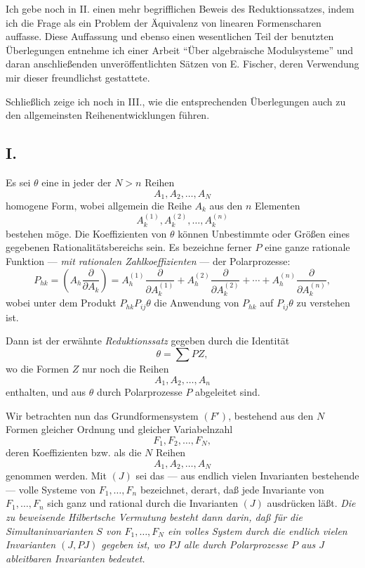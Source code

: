Ich gebe noch in II. einen mehr begrifflichen Beweis des Reduktionssatzes, indem ich die Frage als ein Problem der Äquivalenz von linearen Formenscharen auffasse. Diese Auffassung und ebenso einen wesentlichen Teil der benutzten Überlegungen entnehme ich einer Arbeit ``Über algebraische Modulsysteme'' und daran anschließenden unveröffentlichten Sätzen von E. Fischer, deren Verwendung mir dieser freundlichst gestattete.

Schließlich zeige ich noch in III., wie die entsprechenden Überlegungen auch zu den allgemeinsten Reihenentwicklungen führen.

\subsection*{I.}
Es sei $\theta$ eine in jeder der $N>n$ Reihen
\[
  A_1,A_2,\ldots,A_N
\]
homogene Form, wobei allgemein die Reihe $A_k$ aus den $n$ Elementen
\[
  A_k^{(1)},A_k^{(2)},\ldots,A_k^{(n)}
\]
bestehen möge. Die Koeffizienten von $\theta$ können Unbestimmte oder Größen eines gegebenen Rationalitätsbereichs sein. Es bezeichne ferner $P$ eine ganze rationale Funktion --- \emph{mit rationalen Zahlkoeffizienten} --- der Polarprozesse:
\[
  P_{hk}=\left(A_h\frac{\partial}{\partial A_k}\right)
  =A_h^{(1)}\frac{\partial}{\partial A_k^{(1)}}+
   A_h^{(2)}\frac{\partial}{\partial A_k^{(2)}}+
   \cdots+
   A_h^{(n)}\frac{\partial}{\partial A_k^{(n)}},
\]
wobei unter dem Produkt $P_{hk}P_{ij}\theta$ die Anwendung von $P_{hk}$ auf $P_{ij}\theta$ zu verstehen ist.

Dann ist der erwähnte \emph{Reduktionssatz} gegeben durch die Identität
\begin{equation}
  \theta=\sum PZ,
\tag{1}
\end{equation}
wo die Formen $Z$ nur noch die Reihen
\[
  A_1,A_2,\ldots,A_n
\]
enthalten, und aus $\theta$ durch Polarprozesse $P$ abgeleitet sind.

Wir betrachten nun das Grundformensystem $(F')$, bestehend aus den $N$ Formen gleicher Ordnung und gleicher Variabelnzahl
\[
  F_1,F_2,\ldots,F_N,
\]
deren Koeffizienten bzw. als die $N$ Reihen
\[
  A_1,A_2,\ldots,A_N
\]
genommen werden. Mit $(J)$ sei das --- aus endlich vielen Invarianten bestehende --- volle Systeme von $F_1,\ldots,F_n$ bezeichnet, derart, daß jede Invariante von $F_1,\ldots,F_n$ sich ganz und rational durch die Invarianten $(J)$ ausdrücken läßt. \emph{Die zu beweisende Hilbertsche Vermutung besteht dann darin, daß für die Simultaninvarianten $S$ von $F_1,\ldots,F_N$ ein volles System durch die endlich vielen Invarianten $(J,PJ)$ gegeben ist, wo $PJ$ alle durch Polarprozesse $P$ aus $J$ ableitbaren Invarianten bedeutet.}

